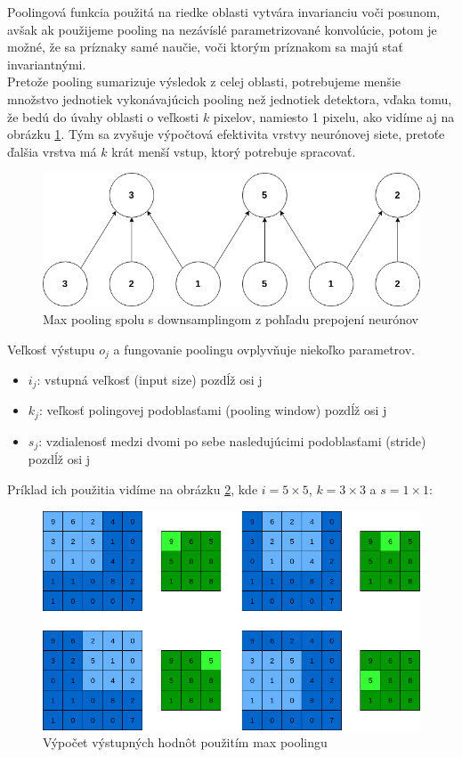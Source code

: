 \indent Poolingová funkcia použitá na riedke oblasti vytvára invarianciu voči posunom, avšak ak použijeme pooling na nezávíslé parametrizované konvolúcie, potom je možné, že sa príznaky samé naučie, voči ktorým príznakom sa majú stať invariantnými\cite{goodfellow2016deep}. \\

\indent Pretože pooling sumarizuje výsledok z celej oblasti, potrebujeme menšie množstvo jednotiek vykonávajúcich pooling než jednotiek detektora, vďaka tomu, že bedú do úvahy oblasti o veľkosti $k$ pixelov, namiesto 1 pixelu, ako vidíme aj na obrázku \ref{fig:pooling}.
Tým sa zvyšuje výpočtová efektivita vrstvy neurónovej siete, pretoťe ďalšia vrstva má $k$ krát menší vstup, ktorý potrebuje spracovať.\cite{goodfellow2016deep} \\

\begin{figure}[H]
	\centering
	\includegraphics[width=0.5\linewidth]{img/pooling}
	\caption{Max pooling spolu s downsamplingom z pohľadu prepojení neurónov}
	\label{fig:pooling}
\end{figure}

Veľkosť výstupu $o_{j}$ a fungovanie poolingu ovplyvňuje niekoľko parametrov.

\begin{itemize}
		\item $i_{j}$: vstupná veľkosť (input size) pozdĺž osi j
		\item $k_{j}$: veľkosť polingovej podoblasťami (pooling window) pozdĺž osi j
		\item $s_{j}$: vzdialenosť medzi dvomi po sebe nasledujúcimi podoblasťami (stride) pozdĺž osi j
\end{itemize}

Príklad ich použitia vidíme na obrázku \ref{fig:poolingex}, kde $i = 5 \times 5$, $k = 3 \times 3$ a  $s = 1 \times 1$:

\begin{figure}[H]
	\centering
	\includegraphics[width=1\linewidth]{img/poolingex}
	\caption{Výpočet výstupných hodnôt použitím max poolingu}
	\label{fig:poolingex}
\end{figure}

